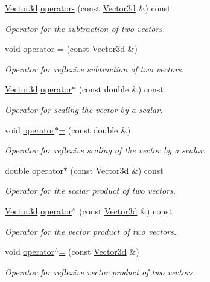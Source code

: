 \begin{DoxyCompactItemize}
\hyperlink{classVector3d}{Vector3d} \hyperlink{classVector3d_a727932bfb1f230c8f256e10a0d45a8c7}{operator-\/} (const \hyperlink{classVector3d}{Vector3d} \&) const 
\begin{DoxyCompactList}\small\item\em Operator for the subtraction of two vectors. \end{DoxyCompactList}\item 
void \hyperlink{classVector3d_a14d45e123683a1f1a2ba32d43083fcd7}{operator-\/=} (const \hyperlink{classVector3d}{Vector3d} \&)
\begin{DoxyCompactList}\small\item\em Operator for reflexive subtraction of two vectors. \end{DoxyCompactList}\item 
\hyperlink{classVector3d}{Vector3d} \hyperlink{classVector3d_a656a4a90ae5619c4deb7851da2aaa2e8}{operator$\ast$} (const double \&) const 
\begin{DoxyCompactList}\small\item\em Operator for scaling the vector by a scalar. \end{DoxyCompactList}\item 
void \hyperlink{classVector3d_a3014b4a7a5feded758421dfb7df4daa2}{operator$\ast$=} (const double \&)
\begin{DoxyCompactList}\small\item\em Operator for reflexive scaling of the vector by a scalar. \end{DoxyCompactList}\item 
double \hyperlink{classVector3d_a43b3a3d87cedd5a88539d030a8853590}{operator$\ast$} (const \hyperlink{classVector3d}{Vector3d} \&) const 
\begin{DoxyCompactList}\small\item\em Operator for the scalar product of two vectors. \end{DoxyCompactList}\item 
\hyperlink{classVector3d}{Vector3d} \hyperlink{classVector3d_a3a8254737a895334fc887d98e8446298}{operator$^\wedge$} (const \hyperlink{classVector3d}{Vector3d} \&) const 
\begin{DoxyCompactList}\small\item\em Operator for the vector product of two vectors. \end{DoxyCompactList}\item 
void \hyperlink{classVector3d_a868e89192951f4a25f63b958ec419f6f}{operator$^\wedge$=} (const \hyperlink{classVector3d}{Vector3d} \&)
\begin{DoxyCompactList}\small\item\em Operator for reflexive vector product of two vectors. \end{DoxyCompactList}\end{DoxyCompactItemize}

